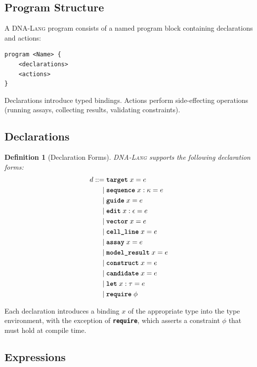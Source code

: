 \documentclass[12pt,a4paper]{article}
\newtheorem{definition}[theorem]{Definition}
\newcommand{\DNALang}{\textsc{DNA-Lang}}
\newcommand{\kw}[1]{\textbf{\texttt{#1}}}
\begin{document}
\subsection{Program Structure}

A \DNALang{} program consists of a named program block containing declarations and actions:

\begin{lstlisting}[style=dnalangstyle,caption={General program structure.},label={lst:structure}]
program <Name> {
    <declarations>
    <actions>
}
\end{lstlisting}

Declarations introduce typed bindings. Actions perform side-effecting operations (running assays, collecting results, validating constraints).

\subsection{Declarations}

\begin{definition}[Declaration Forms]
\DNALang{} supports the following declaration forms:
\begin{align*}
d ::=\; & \kw{target}\; x = e \\
\mid\; & \kw{sequence}\; x : \kappa = e \\
\mid\; & \kw{guide}\; x = e \\
\mid\; & \kw{edit}\; x : \epsilon = e \\
\mid\; & \kw{vector}\; x = e \\
\mid\; & \kw{cell\_line}\; x = e \\
\mid\; & \kw{assay}\; x = e \\
\mid\; & \kw{model\_result}\; x = e \\
\mid\; & \kw{construct}\; x = e \\
\mid\; & \kw{candidate}\; x = e \\
\mid\; & \kw{let}\; x : \tau = e \\
\mid\; & \kw{require}\; \phi
\end{align*}
\end{definition}

Each declaration introduces a binding $x$ of the appropriate type into the type environment, with the exception of \kw{require}, which asserts a constraint $\phi$ that must hold at compile time.

\subsection{Expressions}
\end{document}
